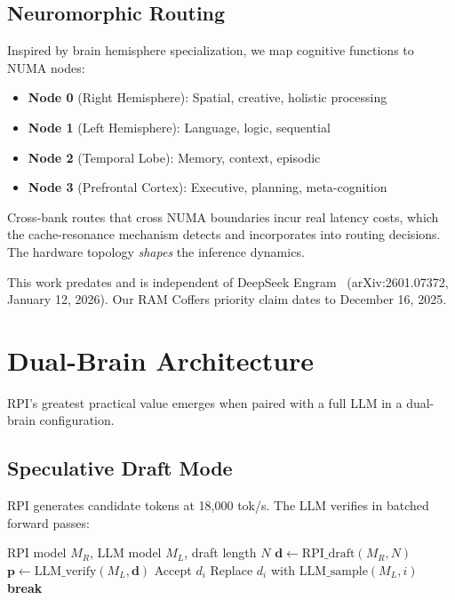 \documentclass[10pt,twocolumn]{article}
\begin{document}
\subsection{Neuromorphic Routing}

Inspired by brain hemisphere specialization, we map cognitive functions to NUMA nodes:

\begin{itemize}
\item \textbf{Node 0} (Right Hemisphere): Spatial, creative, holistic processing
\item \textbf{Node 1} (Left Hemisphere): Language, logic, sequential
\item \textbf{Node 2} (Temporal Lobe): Memory, context, episodic
\item \textbf{Node 3} (Prefrontal Cortex): Executive, planning, meta-cognition
\end{itemize}

Cross-bank routes that cross NUMA boundaries incur real latency costs, which the cache-resonance mechanism detects and incorporates into routing decisions. The hardware topology \emph{shapes} the inference dynamics.

This work predates and is independent of DeepSeek Engram~\cite{deepseek2026engram} (arXiv:2601.07372, January 12, 2026). Our RAM Coffers priority claim dates to December 16, 2025.

\section{Dual-Brain Architecture}
\label{sec:dual}

RPI's greatest practical value emerges when paired with a full LLM in a dual-brain configuration.

\subsection{Speculative Draft Mode}

RPI generates candidate tokens at 18,000 tok/s. The LLM verifies in batched forward passes:

\begin{algorithm}[h]
\caption{Dual-Brain Speculative Generation}
\label{alg:dual}
\begin{algorithmic}[1]
\REQUIRE RPI model $M_R$, LLM model $M_L$, draft length $N$
\STATE $\mathbf{d} \gets \text{RPI\_draft}(M_R, N)$ 
\STATE $\mathbf{p} \gets \text{LLM\_verify}(M_L, \mathbf{d})$ 
    \STATE Accept $d_i$
  \ELSE
    \STATE Replace $d_i$ with $\text{LLM\_sample}(M_L, i)$
    \STATE \textbf{break} 
  \ENDIF
\ENDFOR
\end{algorithmic}
\end{algorithm}
\end{document}
